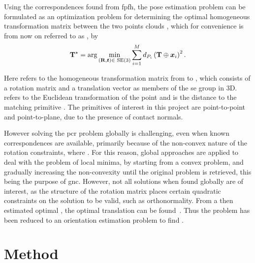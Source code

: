Using the correspondences found from \gls{fpfh}, the pose estimation problem can be formulated as an optimization problem for determining the optimal homogeneous transformation matrix between the two points clouds , which for convenience is from now on referred to as \tf[T]{\star}{}, by
%
\begin{equation} \label{eq:point-cloud-registration-problem}
	\tf[T]{\star}{} = \arg \min_{(\mat{R},\vec{t})\in\SE (3)} \sum^M_{i=1} d_{P_i}\left( \mat{T} \oplus \vec{x}_i \right)^{2}.
\end{equation}

Here  refers to the homogeneous transformation matrix  from  to , which consists of a rotation matrix  and a translation vector  as members of the \gls{se} group in 3D.  refers to the Euclidean transformation of the point  and  is the distance to the matching primitive . The primitives of interest in this project are point-to-point and point-to-plane, due to the presence of contact normals. \medskip

However solving the \gls{pcr} problem globally is challenging, even when known correspondences are available, primarily because of the non-convex nature of the rotation constraints, where . For this reason, global approaches are applied to deal with the problem of local minima, by starting from a convex problem, and gradually increasing the non-convexity until the original problem is retrieved, this being the purpose of \gls{gnc}. However, not all solutions when found globally are of interest, as the structure of the rotation matrix places certain quadratic constraints on the solution to be valid, such as orthonormality. From a then estimated optimal , the optimal translation  can be found~\cite{convex-global-3d-registration-with-lagrangian-duality}. Thus the problem has been reduced to an orientation estimation problem to find \tf[R]{\star}{}.

\section{Method} \label{sec:2-pose-estimation-method}

